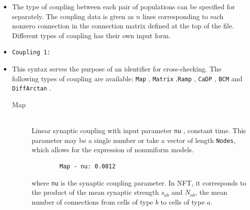 \documentclass[12pt,a4paper]{article}
\newcommand{\type}[1]{{\small\small\tt #1} }
\begin{document}
\begin{itemize}

\item The type of coupling between each pair of populations can be specified for separately. The coupling data is given as $n$ lines  corresponding to each nonzero connection in the connection matrix defined at the top of the file. Different types of coupling has their own input form.
\item \begin{lstlisting}
Coupling 1:
\end{lstlisting}
\item This syntax serves the purpose of an identifier for cross-checking. The following types of coupling are available:  \type{Map},  \type{Matrix},\type{Ramp}, \type{CaDP}, \type{BCM} and \type{DiffArctan}.
\begin{description}

\item[Map]\ \\
    Linear synaptic coupling with input parameter \type{nu}, constant time.
    This parameter may be a single number or take a vector of length
    \texttt{Nodes}, which allows for the expression of nonuniform models.
    \begin{lstlisting}
        Map - nu: 0.0012
    \end{lstlisting}
    where \type{nu} is the synaptic coupling parameter. In NFT, it corresponds
    to the product of the mean synaptic strength $s_{ab}$ and $N_{ab}$, the
    mean number of connections from cells of type $b$ to cells of type $a$.




\end{description}
\end{itemize}
\end{document}

